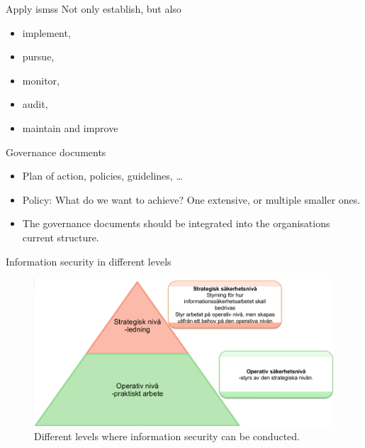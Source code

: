 \documentclass{beamer}
\begin{document}
\begin{frame}{Apply \acp{isms}}
  Not only establish, but also
  \begin{itemize}
    \item implement,
    \item pursue,
    \item monitor,
    \item audit,
    \item maintain and improve
  \end{itemize}
\end{frame}

\begin{frame}{Governance documents}
  \begin{itemize}
    \item Plan of action, policies, guidelines, \dots

    \item Policy: What do we want to achieve?
      One extensive, or multiple smaller ones.

    \item The governance documents should be integrated into the organisations
      current structure.

  \end{itemize}
\end{frame}

\begin{frame}{Information security in different levels}
  \begin{figure}
    \includegraphics[width=\textwidth]{infosak-levels.png}
    \caption{Different levels where information security can be conducted.}
  \end{figure}
\end{frame}
\end{document}

